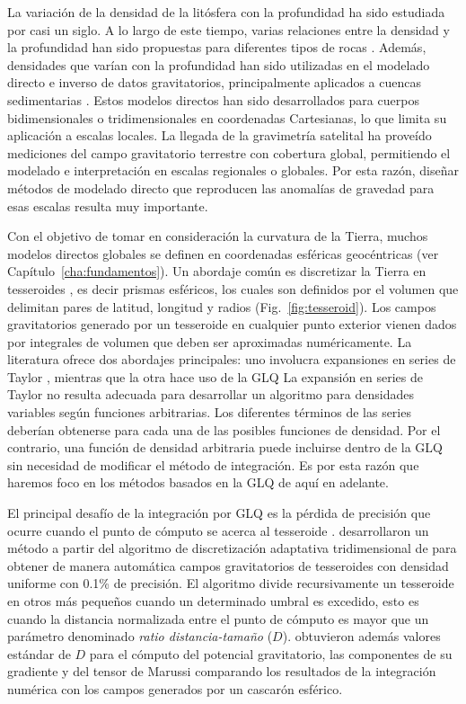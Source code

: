 La variación de la densidad de la litósfera con la profundidad ha sido
estudiada por casi un siglo.
A lo largo de este tiempo, varias relaciones entre la densidad y la profundidad
han sido propuestas para diferentes tipos de rocas
\citep[por ejemplo~][]{maxant1980, rao1986, rao1993, rao1994}.
Además, densidades que varían con la profundidad han sido utilizadas en el
modelado directo e inverso de datos gravitatorios, principalmente aplicados
a cuencas sedimentarias
\citep{cordell1973, rao1986, cowie1990, rao1993, rao1994, zhang2001,
welford2010}.
Estos modelos directos han sido desarrollados para cuerpos bidimensionales
o tridimensionales en coordenadas Cartesianas, lo que limita su aplicación
a escalas locales.
La llegada de la gravimetría satelital ha proveído mediciones del campo
gravitatorio terrestre con cobertura global, permitiendo el modelado
e interpretación en escalas regionales o globales.
Por esta razón, diseñar métodos de modelado directo que reproducen las
anomalías de gravedad para esas escalas resulta muy importante.

Con el objetivo de tomar en consideración la curvatura de la Tierra, muchos
modelos directos globales se definen en coordenadas esféricas geocéntricas
(ver Capítulo~\ref{cha:fundamentos}).
Un abordaje común es discretizar la Tierra en tesseroides \citep{anderson1976},
es decir prismas esféricos, los cuales son definidos por el volumen que
delimitan pares de latitud, longitud y radios (Fig.~\ref{fig:tesseroid}).
Los campos gravitatorios generado por un tesseroide en cualquier punto exterior
vienen dados por integrales de volumen que deben ser aproximadas numéricamente.
La literatura ofrece dos abordajes principales: uno involucra expansiones en
series de Taylor \citep{heck2006, grombein2013}, mientras que la otra hace uso
de la \ac{GLQ}
La expansión en series de Taylor no resulta adecuada para desarrollar un
algoritmo para densidades variables según funciones arbitrarias.
Los diferentes términos de las series deberían obtenerse para cada una de las
posibles funciones de densidad.
Por el contrario, una función de densidad arbitraria puede incluirse dentro de
la \ac{GLQ} sin necesidad de modificar el método de integración.
Es por esta razón que haremos foco en los métodos basados en la \ac{GLQ} de
aquí en adelante.

El principal desafío de la integración por \ac{GLQ} es la pérdida de precisión
que ocurre cuando el punto de cómputo se acerca al tesseroide \citep{ku1977}.
\citet{uieda2016} desarrollaron un método a partir del algoritmo de
discretización adaptativa tridimensional de \citet{li2011} para obtener de
manera automática campos gravitatorios de tesseroides con densidad uniforme con
0.1\% de precisión.
El algoritmo divide recursivamente un tesseroide en otros más pequeños cuando
un determinado umbral es excedido, esto es cuando la distancia normalizada
entre el punto de cómputo es mayor que un parámetro denominado \emph{ratio
distancia-tamaño} ($D$).
\citet{uieda2016} obtuvieron además valores estándar de $D$ para el cómputo del
potencial gravitatorio, las componentes de su gradiente y del tensor de Marussi
comparando los resultados de la integración numérica con los campos generados
por un cascarón esférico.

